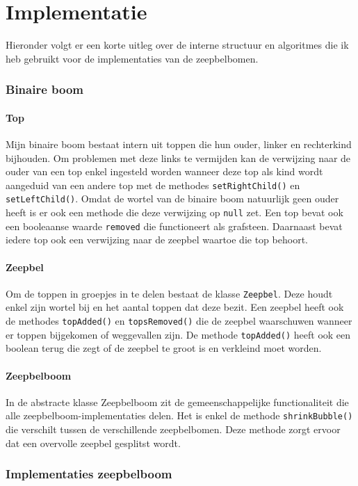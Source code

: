 \documentclass[12pt,hidelinks]{article}
\begin{document}
    \part{Implementatie}
    Hieronder volgt er een korte uitleg over de interne structuur en algoritmes die
    ik heb gebruikt voor de implementaties van de zeepbelbomen.
    \section{Binaire boom}
    \subsection{Top}
    Mijn binaire boom bestaat intern uit toppen die hun ouder,  linker en
    rechterkind bijhouden. Om problemen met deze links te vermijden kan de verwijzing
    naar de ouder van een top enkel ingesteld worden wanneer deze top als kind wordt
    aangeduid van een andere top met de methodes {\tt setRightChild()} en {\tt setLeftChild()}. Omdat de wortel van de binaire boom natuurlijk geen
    ouder heeft is er ook een methode die deze verwijzing op {\tt null} zet.
    Een top bevat ook een booleaanse waarde {\tt removed} die functioneert als
    grafsteen. Daarnaast bevat iedere top ook een verwijzing naar de zeepbel waartoe die 
    top behoort.
    \subsection{Zeepbel}
    Om de toppen in groepjes in te delen bestaat de klasse {\tt Zeepbel}. Deze houdt
    enkel zijn wortel bij en het aantal toppen dat deze bezit. Een zeepbel heeft ook de
    methodes {\tt topAdded()} en {\tt topsRemoved()} die de zeepbel waarschuwen wanneer
    er toppen bijgekomen of weggevallen zijn. De methode {\tt topAdded()} heeft ook
    een boolean terug die zegt of de zeepbel te groot is en verkleind moet worden.
    \subsection{Zeepbelboom}
    In de abstracte klasse Zeepbelboom zit de gemeenschappelijke functionaliteit die
    alle zeepbelboom-implementaties delen. Het is enkel de methode {\tt shrinkBubble()}
    die verschilt tussen de verschillende zeepbelbomen. Deze methode zorgt ervoor dat een 
    overvolle zeepbel gesplitst wordt.

    \section{Implementaties zeepbelboom}
\end{document}
